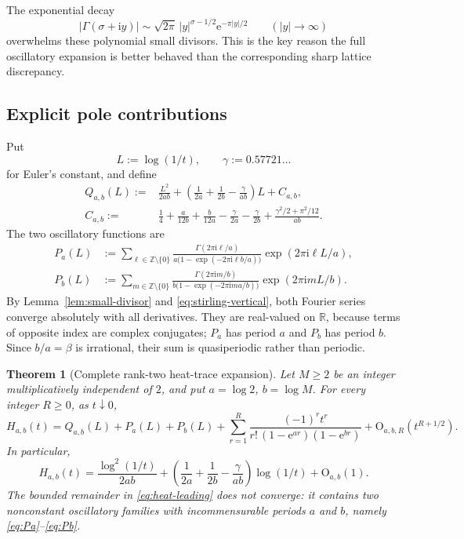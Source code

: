 \documentclass[11pt,oneside]{article}
\newtheorem{theorem}{Theorem}[section]
\theoremstyle{definition}
\theoremstyle{remark}
\newcommand{\Z}{\mathbb Z}
\newcommand{\R}{\mathbb R}
\newcommand{\e}{\mathrm e}
\newcommand{\ii}{\mathrm i}
\newcommand{\bigO}{\mathrm O}
\begin{document}
The exponential decay
\begin{equation}
  |\Gamma(\sigma+\ii y)|
   \sim \sqrt{2\pi}\,|y|^{\sigma-1/2}\e^{-\pi|y|/2}
  \qquad(|y|\to\infty)
  \label{eq:stirling-vertical}
\end{equation}
overwhelms these polynomial small divisors.  This is the key reason the full oscillatory expansion is better behaved than the corresponding sharp lattice discrepancy.

\subsection{Explicit pole contributions}

Put
\[
  L:=\log(1/t),\qquad \gamma:=0.57721\ldots
\]
for Euler's constant, and define
\begin{align}
 Q_{a,b}(L)
  :={}&\frac{L^2}{2ab}
  +\left(\frac1{2a}+\frac1{2b}-\frac\gamma{ab}\right)L
  +C_{a,b},
  \label{eq:Qab}\\
 C_{a,b}
  :={}&\frac14+\frac{a}{12b}+\frac{b}{12a}
  -\frac\gamma{2a}-\frac\gamma{2b}
  +\frac{\gamma^2/2+\pi^2/12}{ab}.
  \label{eq:Cab}
\end{align}
The two oscillatory functions are
\begin{align}
 P_a(L)
  &:={\sum_{\ell\in\Z\setminus\{0\}}}
    \frac{\Gamma(2\pi\ii\ell/a)}
    {a\bigl(1-\exp(-2\pi\ii\ell b/a)\bigr)}
    \exp(2\pi\ii\ell L/a),
  \label{eq:Pa}\\
 P_b(L)
  &:={\sum_{m\in\Z\setminus\{0\}}}
    \frac{\Gamma(2\pi\ii m/b)}
    {b\bigl(1-\exp(-2\pi\ii m a/b)\bigr)}
    \exp(2\pi\ii m L/b).
  \label{eq:Pb}
\end{align}
By Lemma~\ref{lem:small-divisor} and \eqref{eq:stirling-vertical}, both Fourier series converge absolutely with all derivatives.  They are real-valued on $\R$, because terms of opposite index are complex conjugates; $P_a$ has period $a$ and $P_b$ has period $b$.  Since $b/a=\beta$ is irrational, their sum is quasiperiodic rather than periodic.

\begin{theorem}[Complete rank-two heat-trace expansion]
\label{thm:heat-expansion}
Let $M\ge2$ be an integer multiplicatively independent of $2$, and put $a=\log2$, $b=\log M$.  For every integer $R\ge0$, as $t\downarrow0$,
\begin{equation}
\boxed{
 H_{a,b}(t)
 =Q_{a,b}(L)+P_a(L)+P_b(L)
  +\sum_{r=1}^{R}
   \frac{(-1)^r t^r}
        {r!\,(1-\e^{ar})(1-\e^{br})}
  +\bigO_{a,b,R}(t^{R+1/2}).
 }
 \label{eq:full-heat-expansion}
\end{equation}
In particular,
\begin{equation}
  H_{a,b}(t)
  =\frac{\log^2(1/t)}{2ab}
   +\left(\frac1{2a}+\frac1{2b}-\frac\gamma{ab}\right)\log(1/t)
   +\bigO_{a,b}(1).
  \label{eq:heat-leading}
\end{equation}
The bounded remainder in \eqref{eq:heat-leading} does not converge: it contains two nonconstant oscillatory families with incommensurable periods $a$ and $b$, namely \eqref{eq:Pa}--\eqref{eq:Pb}.
\end{theorem}
\end{document}
